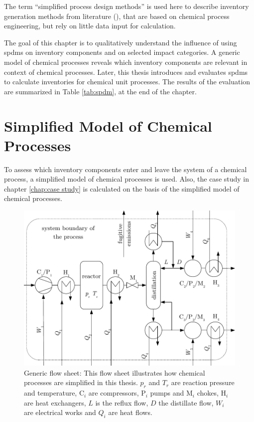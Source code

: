 \label{spdm}
The term ``simplified process design methods'' is used here to describe inventory generation methods from literature (\cite{Parvatker.2019, Hischier.2005, Perry.1999, Smith.2017, JimenezGonzalez.2000}), that are based on chemical process engineering, but rely on little data input for calculation.

The goal of this chapter is to qualitatively understand the influence of using \acl{spdm}s on inventory components and on selected impact categories. A generic model of chemical processes reveals which inventory components are relevant in context of chemical processes. Later, this thesis introduces and evaluates \acl{spdm}s to calculate inventories for chemical unit processes. The results of the evaluation are summarized in Table \ref{tab:spdm}, at the end of the chapter.

\section{Simplified Model of Chemical Processes}
\label{simplified-model-processes}
To assess which inventory components enter and leave the system of a chemical process, a simplified model of chemical processes is used. %
Also, the case study in chapter \ref{chap:case study} is calculated on the basis of the simplified model of chemical processes.

\begin{figure}[htp]
        \centering
        \includegraphics[width=\textwidth]{images/flow_sheet.pdf}
        \caption[Generic flow sheet]{Generic flow sheet: This flow sheet illustrates how chemical processes are simplified in this thesis. $p_r$ and $T_r$ are reaction pressure and temperature, C$_i$ are compressors, P$_i$ pumps and M$_i$ chokes, H$_i$ are heat exchangers, $L$ is the reflux flow, $D$ the distillate flow, $W_i$ are electrical works and $Q_i$ are heat flows.}
        \label{fig:flow sheet}
\end{figure}

